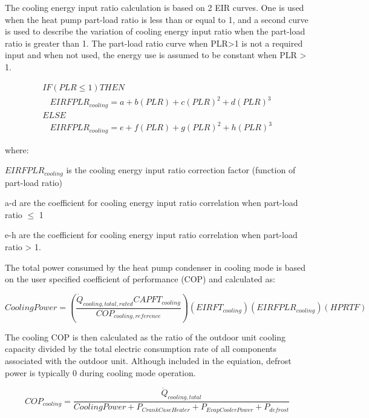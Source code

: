 The cooling energy input ratio calculation is based on 2 EIR curves. One is used when the heat pump part-load ratio is less than or equal to 1, and a second curve is used to describe the variation of cooling energy input ratio when the part-load ratio is greater than 1. The part-load ratio curve when PLR>1 is not a required input and when not used, the energy use is assumed to be constant when PLR > 1.

\begin{equation}
  \begin{array}{l}
  IF\left( {PLR \leq 1} \right)THEN \\
  ~~~~EIRFPLR_{cooling} = a + b \left( PLR \right) + c \left( PLR \right)^2 + d \left( PLR \right)^3 \\
  ELSE \\
  ~~~~EIRFPLR_{cooling} = e + f \left( PLR \right) + g \left( PLR \right)^2 + h \left( PLR \right)^3
  \end{array}
\end{equation}

where:

\(EIRFPLR_{cooling}\) is the cooling energy input ratio correction factor (function of part-load ratio)

a-d are the coefficient for cooling energy input ratio correlation when part-load ratio \(\leq\) 1

e-h are the coefficient for cooling energy input ratio correlation when part-load ratio > 1.

The total power consumed by the heat pump condenser in cooling mode is based on the user specified coefficient of performance (COP) and calculated as:

\begin{equation}
  CoolingPower = \left( \frac{\dot{Q}_{cooling,total,rated} CAPFT_{cooling}}{COP_{cooling,reference}} \right) \left( EIRFT_{cooling} \right) \left( EIRFPLR_{cooling} \right) \left( HPRTF \right)
\end{equation}

The cooling COP is then calculated as the ratio of the outdoor unit cooling capacity divided by the total electric consumption rate of all components associated with the outdoor unit. Although included in the equiation, defrost power is typically 0 during cooling mode operation.

\begin{equation}
  COP_{cooling} = \frac{\dot{Q}_{cooling,total}}{CoolingPower + P_{CrankCaseHeater} + P_{EvapCoolerPower} + P_{defrost}}
\end{equation}

